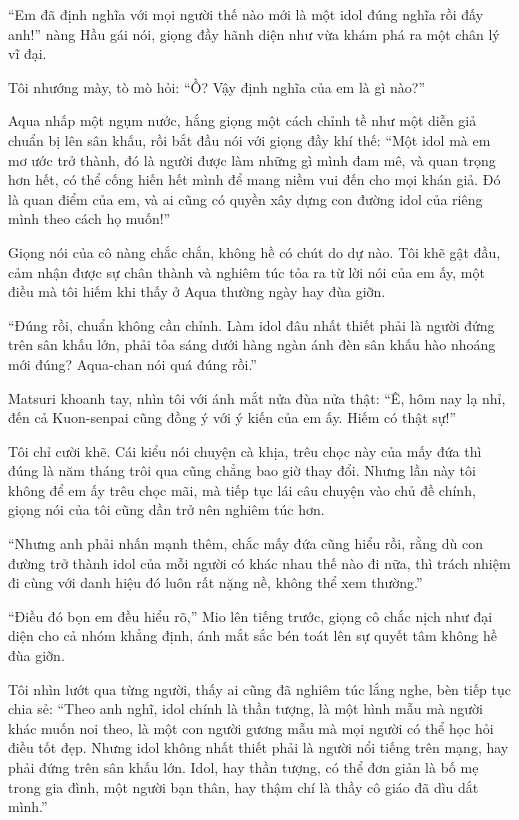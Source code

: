 \documentclass[../main.tex]{subfiles}
\begin{document}
``Em đã định nghĩa với mọi người thế nào mới là một idol đúng nghĩa rồi đấy anh!'' nàng Hầu gái nói, giọng đầy hãnh diện như vừa khám phá ra một chân lý vĩ đại.

Tôi nhướng mày, tò mò hỏi: ``Ồ? Vậy định nghĩa của em là gì nào?''

Aqua nhấp một ngụm nước, hắng giọng một cách chỉnh tề như một diễn giả chuẩn bị lên sân khấu, rồi bắt đầu nói với giọng đầy khí thế: ``Một idol mà em mơ ước trở thành, đó là người được làm những gì mình đam mê, và quan trọng hơn hết, có thể cống hiến hết mình để mang niềm vui đến cho mọi khán giả. Đó là quan điểm của em, và ai cũng có quyền xây dựng con đường idol của riêng mình theo cách họ muốn!''

Giọng nói của cô nàng chắc chắn, không hề có chút do dự nào. Tôi khẽ gật đầu, cảm nhận được sự chân thành và nghiêm túc tỏa ra từ lời nói của em ấy, một điều mà tôi hiếm khi thấy ở Aqua thường ngày hay đùa giỡn.

``Đúng rồi, chuẩn không cần chỉnh. Làm idol đâu nhất thiết phải là người đứng trên sân khấu lớn, phải tỏa sáng dưới hàng ngàn ánh đèn sân khấu hào nhoáng mới đúng? Aqua-chan nói quá đúng rồi.''

Matsuri khoanh tay, nhìn tôi với ánh mắt nửa đùa nửa thật: ``Ê, hôm nay lạ nhỉ, đến cả Kuon-senpai cũng đồng ý với ý kiến của em ấy. Hiếm có thật sự!''

Tôi chỉ cười khẽ. Cái kiểu nói chuyện cà khịa, trêu chọc này của mấy đứa thì đúng là năm tháng trôi qua cũng chẳng bao giờ thay đổi. Nhưng lần này tôi không để em ấy trêu chọc mãi, mà tiếp tục lái câu chuyện vào chủ đề chính, giọng nói của tôi cũng dần trở nên nghiêm túc hơn.

``Nhưng anh phải nhấn mạnh thêm, chắc mấy đứa cũng hiểu rồi, rằng dù con đường trở thành idol của mỗi người có khác nhau thế nào đi nữa, thì trách nhiệm đi cùng với danh hiệu đó luôn rất nặng nề, không thể xem thường.''

``Điều đó bọn em đều hiểu rõ,'' Mio lên tiếng trước, giọng cô chắc nịch như đại diện cho cả nhóm khẳng định, ánh mắt sắc bén toát lên sự quyết tâm không hề đùa giỡn.

Tôi nhìn lướt qua từng người, thấy ai cũng đã nghiêm túc lắng nghe, bèn tiếp tục chia sẻ: ``Theo anh nghĩ, idol chính là thần tượng, là một hình mẫu mà người khác muốn noi theo, là một con người gương mẫu mà mọi người có thể học hỏi điều tốt đẹp. Nhưng idol không nhất thiết phải là người nổi tiếng trên mạng, hay phải đứng trên sân khấu lớn. Idol, hay thần tượng, có thể đơn giản là bố mẹ trong gia đình, một người bạn thân, hay thậm chí là thầy cô giáo đã dìu dắt mình.''
\end{document}
